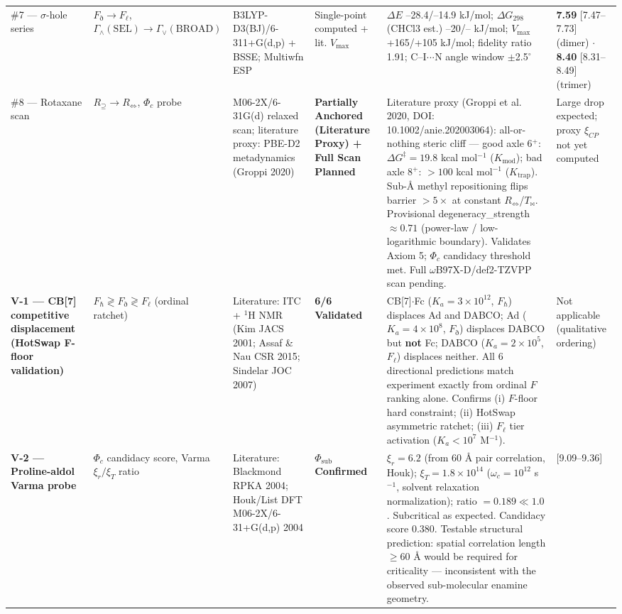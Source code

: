 \documentclass[12pt,a4paper]{article}
\begin{document}
\begin{table}[htbp]
\begin{tabularx}{\textwidth}{>{\centering\arraybackslash}X >{\centering\arraybackslash}X >{\centering\arraybackslash}X >{\centering\arraybackslash}X >{\centering\arraybackslash}X >{\centering\arraybackslash}X}
\#7 --- $\sigma$-hole series & $F_{\eth} \to F_{\ell}$, $\Gamma_{\wedge}(\text{SEL}) \to \Gamma_{\vee}(\text{BROAD})$ & B3LYP-D3(BJ)/6-311+G(d,p) + BSSE; Multiwfn ESP & Single-point computed + lit. $V_{\text{max}}$ & $\Delta E$ --28.4/--14.9 kJ/mol; $\Delta G_{298}$ (CHCl3 est.) --20/-- kJ/mol; $V_{\text{max}}$ +165/+105 kJ/mol; fidelity ratio 1.91; C--I$\cdot$$\cdot$$\cdot$N angle window $\pm$2.5$^{\circ}$ & \textbf{7.59} {[}7.47--7.73{]} (dimer) $\cdot$ \textbf{8.40} {[}8.31--8.49{]} (trimer) \\
\#8 --- Rotaxane scan & $R_{\supseteq} \to R_{\Leftrightarrow}$, $\Phi_c$ probe & M06-2X/6-31G(d) relaxed scan; literature proxy: PBE-D2 metadynamics (Groppi 2020) & \textbf{Partially Anchored (Literature Proxy) + Full Scan Planned} & Literature proxy (Groppi et al. 2020, DOI: 10.1002/anie.202003064): all-or-nothing steric cliff --- good axle 6$^+$: $\Delta G^\ddagger = 19.8$ kcal mol$^{-1}$ ($K_\text{mod}$); bad axle 8$^+$: $> 100$ kcal mol$^{-1}$ ($K_\text{trap}$). Sub-Å methyl repositioning flips barrier $> 5\times$ at constant $R_{\Leftrightarrow}$/$T_{\bowtie}$. Provisional degeneracy\_strength $\approx 0.71$ (power-law / low-logarithmic boundary). Validates Axiom 5; $\Phi_c$ candidacy threshold met. Full $\omega$B97X-D/def2-TZVPP scan pending. & Large drop expected; proxy $\xi_{CP}$ not yet computed \\
\textbf{V-1 --- CB{[}7{]} competitive displacement (HotSwap F-floor validation)} & $F_{\hbar} \gtrless F_{\eth} \gtrless F_{\ell}$ (ordinal ratchet) & Literature: ITC + $^1$H NMR (Kim JACS 2001; Assaf \& Nau CSR 2015; Sindelar JOC 2007) & \textbf{6/6 Validated} & CB{[}7{]}$\cdot$Fc ($K_a = 3 \times 10^{12}$, $F_{\hbar}$) displaces Ad and DABCO; Ad ($K_a = 4 \times 10^8$, $F_{\eth}$) displaces DABCO but \textbf{not} Fc; DABCO ($K_a = 2 \times 10^5$, $F_{\ell}$) displaces neither. All 6 directional predictions match experiment exactly from ordinal $F$ ranking alone. Confirms (i) $F$-floor hard constraint; (ii) HotSwap asymmetric ratchet; (iii) $F_{\ell}$ tier activation ($K_a < 10^7$ M$^{-1}$). & Not applicable (qualitative ordering) \\
\textbf{V-2 --- Proline-aldol Varma probe} & $\Phi_c$ candidacy score, Varma $\xi_r/\xi_T$ ratio & Literature: Blackmond RPKA 2004; Houk/List DFT M06-2X/6-31+G(d,p) 2004 & \textbf{$\Phi_{\text{sub}}$ Confirmed} & $\xi_r = 6.2$ (from 60 Å pair correlation, Houk); $\xi_T = 1.8 \times 10^{14}$ ($\omega_c = 10^{12}$ s$^{-1}$, solvent relaxation normalization); ratio $= 0.189 \ll 1.0$. Subcritical as expected. Candidacy score 0.380. Testable structural prediction: spatial correlation length $\geq 60$ Å would be required for criticality --- inconsistent with the observed sub-molecular enamine geometry. & 9.21 {[}9.09--9.36{]} \\

\end{tabularx}
\end{table}
\end{document}
